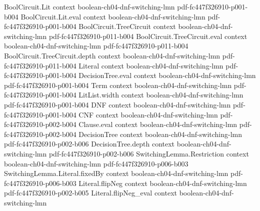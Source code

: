 \begin{lemma}
\label{LMN.absorbOneLevel_general}
\leanok
{}
\proofstep
  {BoolCircuit.Lit}
  {context}
  {boolean-ch04-dnf-switching-lmn}
  {pdf-fc447f326910-p001-b004}
\proofstep
  {BoolCircuit.Lit.eval}
  {context}
  {boolean-ch04-dnf-switching-lmn}
  {pdf-fc447f326910-p001-b004}
\proofstep
  {BoolCircuit.TreeCircuit}
  {context}
  {boolean-ch04-dnf-switching-lmn}
  {pdf-fc447f326910-p011-b004}
\proofstep
  {BoolCircuit.TreeCircuit.eval}
  {context}
  {boolean-ch04-dnf-switching-lmn}
  {pdf-fc447f326910-p011-b004}
\proofstep
  {BoolCircuit.TreeCircuit.depth}
  {context}
  {boolean-ch04-dnf-switching-lmn}
  {pdf-fc447f326910-p011-b004}
\proofstep
  {Literal}
  {context}
  {boolean-ch04-dnf-switching-lmn}
  {pdf-fc447f326910-p001-b004}
\proofstep
  {DecisionTree.eval}
  {context}
  {boolean-ch04-dnf-switching-lmn}
  {pdf-fc447f326910-p001-b004}
\proofstep
  {Term}
  {context}
  {boolean-ch04-dnf-switching-lmn}
  {pdf-fc447f326910-p001-b004}
\proofstep
  {LitList.width}
  {context}
  {boolean-ch04-dnf-switching-lmn}
  {pdf-fc447f326910-p001-b004}
\proofstep
  {DNF}
  {context}
  {boolean-ch04-dnf-switching-lmn}
  {pdf-fc447f326910-p001-b004}
\proofstep
  {CNF}
  {context}
  {boolean-ch04-dnf-switching-lmn}
  {pdf-fc447f326910-p002-b004}
\proofstep
  {Clause.eval}
  {context}
  {boolean-ch04-dnf-switching-lmn}
  {pdf-fc447f326910-p002-b004}
\proofstep
  {DecisionTree}
  {context}
  {boolean-ch04-dnf-switching-lmn}
  {pdf-fc447f326910-p002-b006}
\proofstep
  {DecisionTree.depth}
  {context}
  {boolean-ch04-dnf-switching-lmn}
  {pdf-fc447f326910-p002-b006}
\proofstep
  {SwitchingLemma.Restriction}
  {context}
  {boolean-ch04-dnf-switching-lmn}
  {pdf-fc447f326910-p006-b003}
\proofstep
  {SwitchingLemma.Literal.fixedBy}
  {context}
  {boolean-ch04-dnf-switching-lmn}
  {pdf-fc447f326910-p006-b003}
\proofstep
  {Literal.flipNeg}
  {context}
  {boolean-ch04-dnf-switching-lmn}
  {pdf-fc447f326910-p002-b005}
\proofstep
  {Literal.flipNeg_eval}
  {context}
  {boolean-ch04-dnf-switching-lmn}

\end{lemma}

